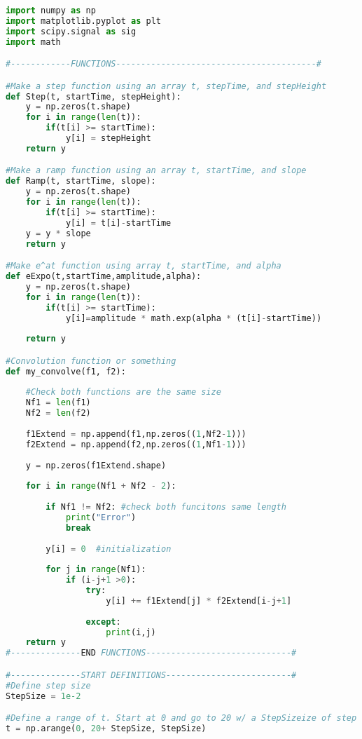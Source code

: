 \documentclass[12pt,a4paper]{article}
\begin{document}
\begin{lstlisting}[language=Python]
import numpy as np
import matplotlib.pyplot as plt
import scipy.signal as sig
import math

#------------FUNCTIONS----------------------------------------#

#Make a step function using an array t, stepTime, and stepHeight
def Step(t, startTime, stepHeight):
    y = np.zeros(t.shape)
    for i in range(len(t)):
        if(t[i] >= startTime):
            y[i] = stepHeight
    return y

#Make a ramp function using an array t, startTime, and slope
def Ramp(t, startTime, slope):
    y = np.zeros(t.shape)
    for i in range(len(t)):
        if(t[i] >= startTime):
            y[i] = t[i]-startTime
    y = y * slope
    return y

#Make e^at function using array t, startTime, and alpha
def eExpo(t,startTime,amplitude,alpha):
    y = np.zeros(t.shape)
    for i in range(len(t)):
        if(t[i] >= startTime):
            y[i]=amplitude * math.exp(alpha * (t[i]-startTime))
    
    return y

#Convolution function or something
def my_convolve(f1, f2):
    
    #Check both functions are the same size
    Nf1 = len(f1)
    Nf2 = len(f2)
    
    f1Extend = np.append(f1,np.zeros((1,Nf2-1)))
    f2Extend = np.append(f2,np.zeros((1,Nf1-1)))
    
    y = np.zeros(f1Extend.shape)
    
    for i in range(Nf1 + Nf2 - 2):
        
        if Nf1 != Nf2: #check both funcitons same length
            print("Error")
            break
        
        y[i] = 0  #initialization
        
        for j in range(Nf1):
            if (i-j+1 >0):
                try:
                    y[i] += f1Extend[j] * f2Extend[i-j+1]
                
                except:
                    print(i,j)
    return y
#--------------END FUNCTIONS-----------------------------#

#--------------START DEFINITIONS-------------------------#
#Define step size
StepSize = 1e-2

#Define a range of t. Start at 0 and go to 20 w/ a StepSizeize of step
t = np.arange(0, 20+ StepSize, StepSize)


\end{lstlisting}
\end{document}
